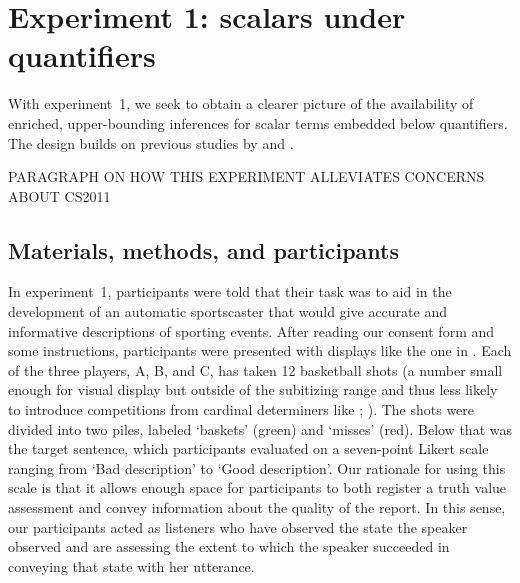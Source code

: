 \documentclass[leqno]{article}
\begin{document}
\section{Experiment 1: scalars under quantifiers}\label{sec:exp1}

With experiment~1, we seek to obtain a clearer picture of the
availability of enriched, upper-bounding inferences for scalar terms
embedded below quantifiers. The design builds on previous studies by
\citet{Geurts:Pouscoulous:2009} and \citet{Chemla:Spector:2011}.


PARAGRAPH ON HOW THIS EXPERIMENT ALLEVIATES CONCERNS ABOUT CS2011

\subsection{Materials, methods, and participants}


In experiment~1, participants were told that their task was to aid in
the development of an automatic sportscaster that would give accurate
and informative descriptions of sporting events. After reading our
consent form and some instructions, participants were presented with
displays like the one in . Each of the three players,
A, B, and C, has taken 12 basketball shots (a number small enough for
visual display but outside of the subitizing range and thus less
likely to introduce competitions from cardinal determiners like
; \citealt{Degen:Tanenhaus:2014}). The shots were
divided into two piles, labeled `baskets' (green) and `misses'
(red). Below that was the target sentence, which participants
evaluated on a seven-point Likert scale ranging from `Bad description'
to `Good description'. Our rationale for using this scale is that it
allows enough space for participants to both register a truth value
assessment and convey information about the quality of the report. In
this sense, our participants acted as listeners who have observed the
state the speaker observed and are assessing the extent to which the speaker
succeeded in conveying that state with her utterance.
\end{document}
